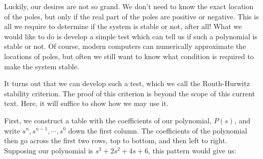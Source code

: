 Luckily, our desires are not so grand. We don't need to know the exact location of the poles, but only if the real part of the poles are positive or negative. This is all we require to determine if the system is stable or not, after all! What we would like to do is develop a simple test which can tell us if such a polynomial is stable or not. Of course, modern computers can numerically approximate the locations of poles, but often we still want to know what condition is required to make the system stable.

It turns out that we can develop such a test, which we call the Routh-Hurwitz stability criterion. The proof of this criterion is beyond the scope of this current text. Here, it will suffice to show how we may use it.

First, we construct a table with the coefficients of our polynomial, $P(s)$, and write $s^n,s^{n-1},\cdots ,s^0$  down the first column. The coefficients of the polynomial then go across the first two rows, top to bottom, and then left to right. Supposing our polynomial is $s^3+2s^2+4s+6$, this pattern would give us:


